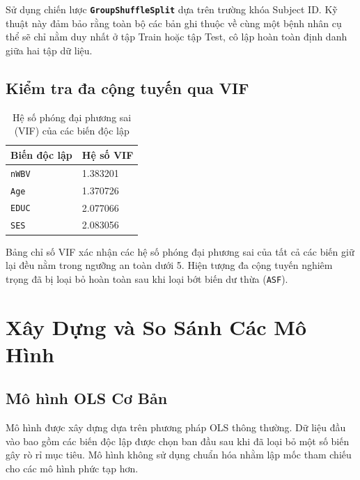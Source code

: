 Sử dụng chiến lược \textbf{\texttt{GroupShuffleSplit}} dựa trên trường khóa Subject ID. Kỹ thuật này đảm bảo rằng toàn bộ các bản ghi thuộc về cùng một bệnh nhân cụ thể sẽ chỉ nằm duy nhất ở tập Train hoặc tập Test, cô lập hoàn toàn định danh giữa hai tập dữ liệu.

\subsection{Kiểm tra đa cộng tuyến qua VIF}

\begin{table}[H]
    \centering
    \renewcommand{\arraystretch}{1.3}
    \setlength{\tabcolsep}{10pt}
    \begin{tabular}{|p{4cm}|p{4cm}|}
        \hline
        \rowcolor[rgb]{0.8, 0.9, 1.0}
        \textbf{Biến độc lập} & \textbf{Hệ số VIF} \\ \hline
        \texttt{nWBV} & 1.383201 \\ \hline
        \texttt{Age} & 1.370726 \\ \hline
        \texttt{EDUC} & 2.077066 \\ \hline
        \texttt{SES} & 2.083056 \\ \hline
    \end{tabular}
    \caption{Hệ số phóng đại phương sai (VIF) của các biến độc lập}
\end{table}

Bảng chỉ số VIF xác nhận các hệ số phóng đại phương sai của tất cả các biến giữ lại đều nằm trong ngưỡng an toàn dưới 5. Hiện tượng đa cộng tuyến nghiêm trọng đã bị loại bỏ hoàn toàn sau khi loại bớt biến dư thừa (\texttt{ASF}).

\newpage

\section{Xây Dựng và So Sánh Các Mô Hình}

\subsection{Mô hình OLS Cơ Bản}

Mô hình được xây dựng dựa trên phương pháp OLS thông thường. Dữ liệu đầu vào bao gồm các biến độc lập được chọn ban đầu sau khi đã loại bỏ một số biến gây rò rỉ mục tiêu. Mô hình không sử dụng chuẩn hóa nhằm lập mốc tham chiếu cho các mô hình phức tạp hơn.


